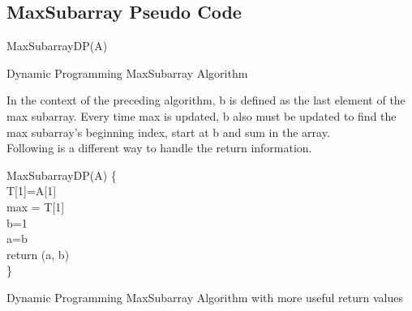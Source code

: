 \documentclass[12pt,letterpaper]{article}
\begin{document}
\subsection{MaxSubarray Pseudo Code}
\begin{algorithm}
MaxSubarrayDP(A) 
\caption{Dynamic Programming MaxSubarray Algorithm}
\label{MaxSubarray}
\end{algorithm}
\FloatBarrier
In the context of the preceding algorithm, b is defined as the last element of the max subarray. Every time max is updated, b also must be updated to find the max subarray's beginning index, start at b and sum in the array. \\
Following is a different way to handle the return information. 
\begin{algorithm}
MaxSubarrayDP(A) \{\\
	T[1]=A[1] \\
	max = T[1] \\
	b=1 \\
	a=b\\
	return (a, b)\\
\}
\caption{Dynamic Programming MaxSubarray Algorithm with more useful return values}
\label{Better MaxSubarray}
\end{algorithm}
\FloatBarrier
\end{document}
